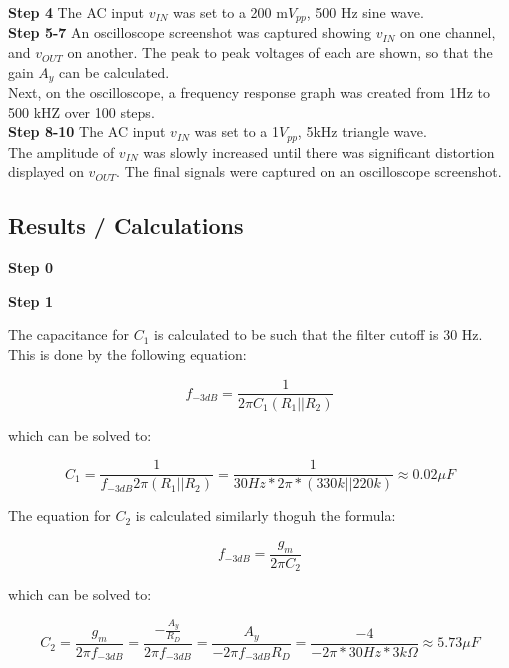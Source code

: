 \documentclass[notitlepage, 12pt]{report}  %
\begin{document}
\textbf{Step 4}
The AC input $v_{IN}$ was set to a 200 m$V_{pp}$, 500 Hz sine wave. \\

\textbf{Step 5-7}
An oscilloscope screenshot was captured showing $v_{IN}$ on one channel, and $v_{OUT}$ on another. The peak to peak voltages of each are shown, 
so that the gain $A_y$ can be calculated.\\

Next, on the oscilloscope, a frequency response graph was created from 1Hz to 500 kHZ over 100 steps. \\

\textbf{Step 8-10}
The AC input $v_{IN}$ was set to a 1$V_{pp}$, 5kHz triangle wave. \\

The amplitude of $v_{IN}$ was slowly increased until there was significant distortion displayed on $v_{OUT}$. The final signals were captured 
on an oscilloscope screenshot. \\


\subsection*{Results / Calculations}

\textbf{Step 0}


\textbf{Step 1}

The capacitance for $C_1$ is calculated to be such that the filter cutoff is 30 Hz.
This is done by the following equation:

\begin{equation}
    f_{-3 dB} = \frac{1}{2\pi C_1 (R_1 || R_2)}
\end{equation}

which can be solved to:

\begin{equation}
    C_1 = \frac{1}{f_{-3 dB} 2\pi (R_1 || R_2)} = \frac{1}{30 Hz * 2\pi * (330k || 220k)} \approx 0.02 \mu F
\end{equation}

The equation for $C_2$ is calculated similarly thoguh the formula:

\begin{equation}
    f_{-3 dB} = \frac{g_m}{2\pi C_2}
\end{equation}

which can be solved to:

\begin{equation}
    C_2 = \frac{g_m}{2\pi f_{-3 dB}} =  
    \frac{-\frac{A_y}{R_D}}{2\pi f_{-3 dB}} = 
    \frac{A_y}{-2\pi f_{-3 dB} R_D} =  
    \frac{-4}{-2\pi * 30 Hz * 3k\Omega} \approx 
    5.73 \mu F
\end{equation}
\end{document}
